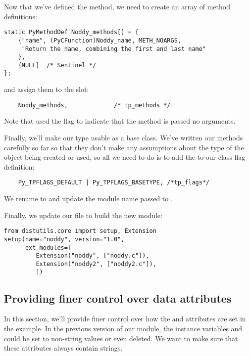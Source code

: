 Now that we've defined the method, we need to create an array of
method definitions:

\begin{verbatim}
static PyMethodDef Noddy_methods[] = {
    {"name", (PyCFunction)Noddy_name, METH_NOARGS,
     "Return the name, combining the first and last name"
    },
    {NULL}  /* Sentinel */
};
\end{verbatim}

and assign them to the  slot:

\begin{verbatim}
    Noddy_methods,             /* tp_methods */
\end{verbatim}

Note that used the  flag to indicate that the
method is passed no arguments.

Finally, we'll make our type usable as a base class.  We've written
our methods carefully so far so that they don't make any assumptions
about the type of the object being created or used, so all we need to
do is to add the  to our class flag
definition:

\begin{verbatim}
    Py_TPFLAGS_DEFAULT | Py_TPFLAGS_BASETYPE, /*tp_flags*/
\end{verbatim}

We rename  to 
and update the module name passed to .

Finally, we update our  file to build the new module:

\begin{verbatim}
from distutils.core import setup, Extension
setup(name="noddy", version="1.0",
      ext_modules=[
         Extension("noddy", ["noddy.c"]),
         Extension("noddy2", ["noddy2.c"]),
         ])
\end{verbatim}

\subsection{Providing finer control over data attributes}

In this section, we'll provide finer control over how the
 and  attributes are set in the
 example. In the previous version of our module, the
instance variables  and  could be set to
non-string values or even deleted. We want to make sure that these
attributes always contain strings.

